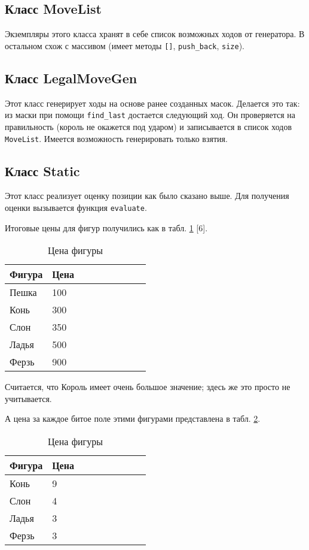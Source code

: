 \subsection*{Класс MoveList}

Экземпляры этого класса хранят в себе список возможных ходов от генератора. В остальном схож с массивом (имеет методы \texttt{[]}, \texttt{push\_back}, \texttt{size}).

\subsection*{Класс LegalMoveGen}

Этот класс генерирует ходы на основе ранее созданных масок. Делается это так: из маски при помощи \texttt{find\_last} достается следующий ход. Он проверяется на правильность (король не окажется под ударом) и записывается в список ходов \texttt{MoveList}. Имеется возможность генерировать только взятия.

\subsection*{Класс Static}

Этот класс реализует оценку позиции как было сказано выше. Для получения оценки вызывается функция \texttt{evaluate}.

Итоговые цены для фигур получились как в табл. \ref{tab: material} [6].

\begin{table}[h]
	\centering
	\caption{Цена фигуры}
	\label{tab: material}
	\begin{tabular}{|l|l|l|l|l|l|l|l|l|}
		\hline
		Фигура & Цена \\ \hline
		Пешка & 100 \\ \hline
		Конь & 300 \\ \hline
		Слон & 350  \\ \hline
		Ладья & 500 \\ \hline
		Ферзь & 900 \\ \hline
	\end{tabular}
\end{table}

Считается, что Король имеет очень большое значение; здесь же это просто не учитывается.

А цена за каждое битое поле этими фигурами представлена в табл. \ref{tab: mobility}.

\begin{table}[h]
	\centering
	\caption{Цена фигуры}
	\label{tab: mobility}
	\begin{tabular}{|l|l|l|l|l|l|l|l|l|}
		\hline
		Фигура & Цена \\ 
		\hline
		Конь & 9 \\ 
		\hline
		Слон & 4  \\ 
		\hline
		Ладья & 3 \\ 
		\hline
		Ферзь & 3 \\ 
		\hline
	\end{tabular}
\end{table}

